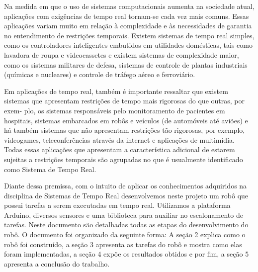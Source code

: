Na medida em que o uso de sistemas computacionais aumenta na sociedade atual, aplicações com exigências de tempo real tornam-se cada vez mais comuns. Essas aplicações variam muito em relação à complexidade e às necessidades de garantia no entendimento de restrições temporais. Existem sistemas de tempo real simples, como os controladores inteligentes embutidos em utilidades domésticas, tais como lavadora de roupa e videocassetes e existem sistemas de complexidade maior, como os sistemas militares de defesa, sistemas de controle de plantas industriais (químicas e nucleares) e controle de tráfego aéreo e ferroviário.

Em aplicações de tempo real, também é importante ressaltar que existem sistemas que apresentam restrições de tempo mais rigorosas do que outras, por exem- plo, os sistemas responsáveis pelo monitoramento de pacientes em hospitais, sistemas embarcados em robôs e veículos (de automóveis até aviões) e há também sistemas que não apresentam restrições tão rigorosas, por exemplo, videogames, teleconferências através da internet e aplicações de multimídia. Todas essas aplicações que apresentam a característica adicional de estarem sujeitas a restrições temporais são agrupadas no que é usualmente identificado como Sistema de Tempo Real.

Diante dessa premissa, com o intuito de aplicar os conhecimentos adquiridos na disciplina de Sistemas de Tempo Real desenvolvemos neste projeto um robô que possui tarefas a serem executadas em tempo real.  Utilizamos a plataforma Arduino, diversos sensores e uma biblioteca para auxiliar no escalonamento de tarefas. Neste documento são detalhadas todas as etapas do desenvolvimento do robô. O documento foi organizado da seguinte forma: A seção 2 explica como o robô foi construído, a seção 3 apresenta as tarefas do robô e mostra como elas foram implementadas, a seção 4 expõe os resultados obtidos e por fim, a seção 5 apresenta a conclusão do trabalho. 